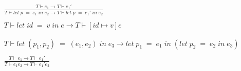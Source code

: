 \begin{figure}[htb]
\begin{align*}
\tag{E-Let}
&\frac{T \vdash e_{1}\rightarrow T \vdash e_{1}'}
{T \vdash let \; p \; = \; e_{1} \; in \; e_{2} \rightarrow T \vdash let \; p \; = \; e_{1}' \; in \; e_{2}}
\\ \\
\tag{E-LetV}
&T \vdash let \; id \; = \; v \; in \; e \rightarrow T \vdash [id \mapsto v]e \\ \\
\\
\tag{E-PatternMatch}
&T \vdash let \; (p_{1},p_{2}) \; = \; (e_{1},e_{2}) \; in \; e_{3} \rightarrow
let \; p_{1} \; = \; e_{1} \; in \;
(let \; p_{2}  \; = \; e_{2} \; in \; e_{3}) \\ \\
\tag{E-App1}
&\frac{T \vdash e_{1} \rightarrow T \vdash e_{1}'}
{T \vdash e_{1} e_{2} \rightarrow T \vdash e_{1}' e_{2}}\\ \\

\end{align*}
\end{figure}
